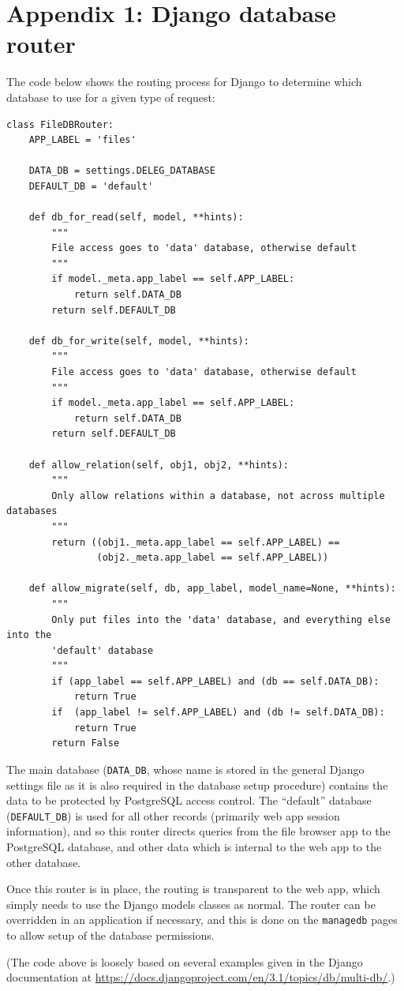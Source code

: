 \documentclass{article}
\begin{document}
\section*{Appendix 1: Django database router}
\label{sec:appendix1}
The code below shows the routing process for Django to determine which database to use for a given type of request:

\begin{verbatim}
class FileDBRouter:
    APP_LABEL = 'files'

    DATA_DB = settings.DELEG_DATABASE
    DEFAULT_DB = 'default'

    def db_for_read(self, model, **hints):
        """
        File access goes to 'data' database, otherwise default
        """
        if model._meta.app_label == self.APP_LABEL:
            return self.DATA_DB
        return self.DEFAULT_DB

    def db_for_write(self, model, **hints):
        """
        File access goes to 'data' database, otherwise default
        """
        if model._meta.app_label == self.APP_LABEL:
            return self.DATA_DB
        return self.DEFAULT_DB

    def allow_relation(self, obj1, obj2, **hints):
        """
        Only allow relations within a database, not across multiple databases
        """
        return ((obj1._meta.app_label == self.APP_LABEL) ==
                (obj2._meta.app_label == self.APP_LABEL))

    def allow_migrate(self, db, app_label, model_name=None, **hints):
        """
        Only put files into the 'data' database, and everything else into the
        'default' database
        """
        if (app_label == self.APP_LABEL) and (db == self.DATA_DB):
            return True
        if  (app_label != self.APP_LABEL) and (db != self.DATA_DB):
            return True
        return False
\end{verbatim}

The main database (\verb+DATA_DB+, whose name is stored in the general Django settings file as it is also required in the database setup procedure) contains the data to be protected by PostgreSQL access control. The ``default'' database (\verb+DEFAULT_DB+) is used for all other records (primarily web app session information), and so this router directs queries from the file browser app to the PostgreSQL database, and other data which is internal to the web app to the other database.

Once this router is in place, the routing is transparent to the web app, which simply needs to use the Django models classes as normal. The router can be overridden in an application if necessary, and this is done on the \verb+managedb+ pages to allow setup of the database permissions.

(The code above is loosely based on several examples given in the Django documentation at \url{https://docs.djangoproject.com/en/3.1/topics/db/multi-db/}.)
\end{document}
